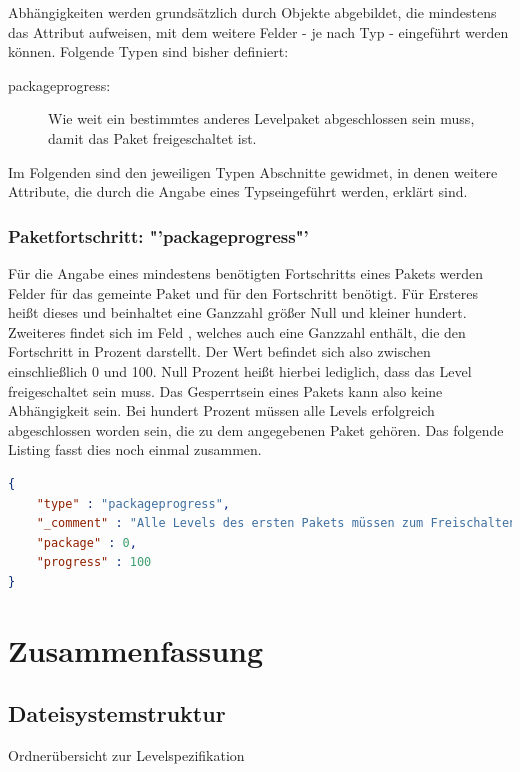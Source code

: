 Abhängigkeiten werden grundsätzlich durch Objekte abgebildet, die mindestens das Attribut  aufweisen, mit dem weitere Felder - je nach Typ - eingeführt werden können.
Folgende Typen sind bisher definiert:
\begin{description}
	\item[packageprogress:] Wie weit ein bestimmtes anderes Levelpaket abgeschlossen sein muss, damit das Paket freigeschaltet ist.
\end{description}
Im Folgenden sind den jeweiligen Typen Abschnitte gewidmet, in denen weitere Attribute, die durch die Angabe eines Typseingeführt werden, erklärt sind.

\subsubsection{Paketfortschritt: "'packageprogress"'}
Für die Angabe eines mindestens benötigten Fortschritts eines Pakets werden Felder für das gemeinte Paket und für den Fortschritt benötigt.
Für Ersteres heißt dieses  und beinhaltet eine Ganzzahl größer Null und kleiner hundert.
Zweiteres findet sich im Feld , welches auch eine Ganzzahl enthält, die den Fortschritt in Prozent darstellt.
Der Wert befindet sich also zwischen einschließlich 0 und 100.
Null Prozent heißt hierbei lediglich, dass das Level freigeschaltet sein muss. 
Das Gesperrtsein eines Pakets kann also keine Abhängigkeit sein.
Bei hundert Prozent müssen alle Levels erfolgreich abgeschlossen worden sein, die zu dem angegebenen Paket gehören.
Das folgende Listing fasst dies noch einmal zusammen.
\begin{lstlisting}[language=json,caption={Beispielhafte Definition einer Abhängigkeit vom Typ "'boxprogress"'}]
{
	"type" : "packageprogress",
	"_comment" : "Alle Levels des ersten Pakets müssen zum Freischalten erfolgreich abgeschlossen worden sein",
	"package" : 0,
	"progress" : 100
}
\end{lstlisting}

\section{Zusammenfassung}
\subsection{Dateisystemstruktur}
Ordnerübersicht zur Levelspezifikation

